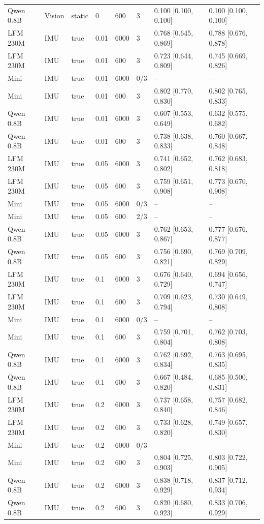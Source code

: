 {\begin{longtable}{@{}llllllll@{}}
Qwen 0.8B & Vision & static & 0 & 600 & 3 & 0.100 [0.100, 0.100] & 0.100 [0.100, 0.100] \\
LFM 230M & IMU & true & 0.01 & 6000 & 3 & 0.768 [0.645, 0.869] & 0.788 [0.676, 0.878] \\
LFM 230M & IMU & true & 0.01 & 600 & 3 & 0.723 [0.644, 0.809] & 0.745 [0.669, 0.826] \\
Mini & IMU & true & 0.01 & 6000 & 0/3 & -- & -- \\
Mini & IMU & true & 0.01 & 600 & 3 & 0.802 [0.770, 0.830] & 0.802 [0.765, 0.833] \\
Qwen 0.8B & IMU & true & 0.01 & 6000 & 3 & 0.607 [0.553, 0.649] & 0.632 [0.575, 0.682] \\
Qwen 0.8B & IMU & true & 0.01 & 600 & 3 & 0.738 [0.638, 0.833] & 0.760 [0.667, 0.848] \\
LFM 230M & IMU & true & 0.05 & 6000 & 3 & 0.741 [0.652, 0.802] & 0.762 [0.683, 0.818] \\
LFM 230M & IMU & true & 0.05 & 600 & 3 & 0.759 [0.651, 0.908] & 0.773 [0.670, 0.908] \\
Mini & IMU & true & 0.05 & 6000 & 0/3 & -- & -- \\
Mini & IMU & true & 0.05 & 600 & 2/3 & -- & -- \\
Qwen 0.8B & IMU & true & 0.05 & 6000 & 3 & 0.762 [0.653, 0.867] & 0.777 [0.676, 0.877] \\
Qwen 0.8B & IMU & true & 0.05 & 600 & 3 & 0.756 [0.690, 0.821] & 0.769 [0.709, 0.829] \\
LFM 230M & IMU & true & 0.1 & 6000 & 3 & 0.676 [0.640, 0.729] & 0.694 [0.656, 0.747] \\
LFM 230M & IMU & true & 0.1 & 600 & 3 & 0.709 [0.623, 0.794] & 0.730 [0.649, 0.808] \\
Mini & IMU & true & 0.1 & 6000 & 0/3 & -- & -- \\
Mini & IMU & true & 0.1 & 600 & 3 & 0.759 [0.701, 0.804] & 0.762 [0.703, 0.808] \\
Qwen 0.8B & IMU & true & 0.1 & 6000 & 3 & 0.762 [0.692, 0.834] & 0.763 [0.695, 0.835] \\
Qwen 0.8B & IMU & true & 0.1 & 600 & 3 & 0.667 [0.484, 0.820] & 0.685 [0.500, 0.831] \\
LFM 230M & IMU & true & 0.2 & 6000 & 3 & 0.737 [0.658, 0.840] & 0.757 [0.682, 0.846] \\
LFM 230M & IMU & true & 0.2 & 600 & 3 & 0.733 [0.628, 0.820] & 0.749 [0.657, 0.830] \\
Mini & IMU & true & 0.2 & 6000 & 0/3 & -- & -- \\
Mini & IMU & true & 0.2 & 600 & 3 & 0.804 [0.725, 0.903] & 0.803 [0.722, 0.905] \\
Qwen 0.8B & IMU & true & 0.2 & 6000 & 3 & 0.838 [0.718, 0.929] & 0.837 [0.712, 0.934] \\
Qwen 0.8B & IMU & true & 0.2 & 600 & 3 & 0.820 [0.680, 0.923] & 0.833 [0.706, 0.929] \\
\bottomrule
\end{longtable}}\par

